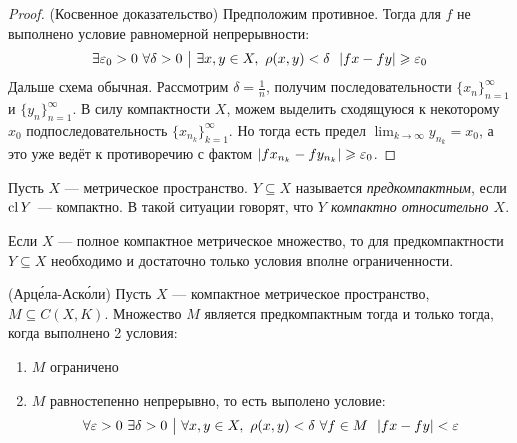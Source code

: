 \begin{proof} (Косвенное доказательство)
	Предположим противное. Тогда для $f$ не выполнено условие равномерной непрерывности:
	\[
		\exists \varepsilon_0 > 0\ \forall \delta > 0 \ \big|\  \exists x, y \in X,\ \rho(x, y) < \delta\ \ |fx - fy| \geqslant \varepsilon_0
	\]
	Дальше схема обычная. Рассмотрим $\delta = \frac{1}{n}$, получим последовательности $\{x_n\}_{n = 1}^\infty$ и $\{y_n\}_{n = 1}^\infty$. В силу компактности $X$, можем выделить сходящуюся к некоторому $x_0$ подпоследовательность $\{x_{n_k}\}_{k = 1}^\infty$. Но тогда есть предел $\lim_{k \to \infty} y_{n_k} = x_0$, а это уже ведёт к противоречию с фактом $|fx_{n_k} - fy_{n_k}| \geqslant \varepsilon_0$.
\end{proof}

\begin{definition}
	Пусть $X$ --- метрическое пространство. $Y \subseteq X$ называется \textit{предкомпактным}, если $\operatorname{cl} Y$ --- компактно. В такой ситуации говорят, что \textit{$Y$ компактно относительно $X$}.
\end{definition}

\begin{exercise}
	Если $X$ --- полное компактное метрическое множество, то для предкомпактности $Y \subseteq X$ необходимо и достаточно только условия вполне ограниченности.
\end{exercise}

\begin{theorem} (Арц\'{е}ла-Аск\'{о}ли)
	Пусть $X$ --- компактное метрическое пространство, $M \subseteq C(X, K)$. Множество $M$ является предкомпактным тогда и только тогда, когда выполнено 2 условия:
	\begin{enumerate}
		\item $M$ ограничено
		
		\item $M$ равностепенно непрерывно, то есть выполено условие:
		\[
			\forall \varepsilon > 0\ \exists \delta >0 \ \big|\  \forall x, y \in X,\ \rho(x, y) < \delta\ \forall f \in M\ \ |fx - fy| < \varepsilon
		\] 
	\end{enumerate}
\end{theorem}

